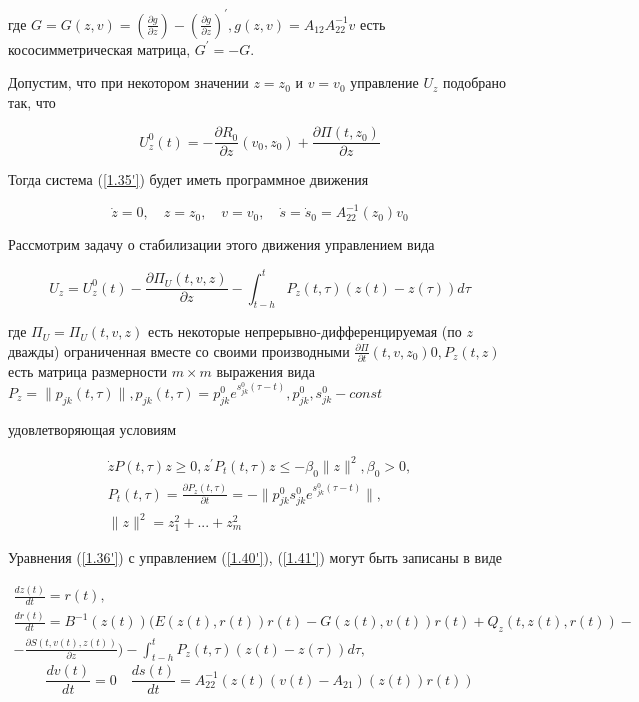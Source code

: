 где $G = G(z, v) = (\frac{\partial g}{\partial z}) - (\frac{\partial g}{\partial z})^{'}, g(z, v) = A_{12} A_{22}^{-1} v$ есть кососимметрическая матрица, $G^{'} = -G$.

Допустим, что при некотором значении $z = z_0$ и $v = v_0$ управление $U_z$ подобрано так, что 

\begin{equation} \label{1.38'}
U_z^0 (t) = - \frac{\partial R_0}{\partial z} (v_0, z_0) + \frac{\partial \Pi (t, z_0)}{\partial z}
\end{equation}

Тогда система (\ref{1.35'}) будет иметь программное движения 

\begin{equation} \label{1.39'}
\dot z = 0, \quad z = z_0, \quad v = v_0, \quad \dot s = \dot s_0 = A_{22}^{-1} (z_0) v_0
\end{equation}

Рассмотрим задачу о стабилизации этого движения управлением вида 

\begin{equation} \label{1.40'}
U_z = U_z^0 (t) - \frac{\partial \Pi_U (t, v, z)}{\partial z} - \int_{t - h}^{t} P_z (t, \tau) (z(t) - z(\tau)) d \tau
\end{equation}

где $\Pi_U = \Pi_U (t, v, z)$ есть некоторые непрерывно-дифференцируемая (по $z$ дважды) ограниченная вместе со своими производными $\frac{\partial \Pi}{\partial t} (t, v, z_0) 0 , P_z(t, z)$ есть матрица размерности $m \times m$ выражения вида $P_z = \| p_{jk} (t, \tau) \|, p_{jk} (t, \tau) = p_{jk}^0 e^{s_{jk}^0 (\tau - t)}, p_{jk}^0, s_{jk}^0 - const$

удовлетворяющая условиям

\begin{equation} \label{1.41'}
\begin{array}{c}
\dot z P(t, \tau) z \ge 0, z^{'} P_t (t, \tau) z \le - \beta_0 \| z \|^2, \beta_0 > 0,\\
P_t (t, \tau) = \frac{\partial P_z (t, \tau)}{\partial t} = - \| p_{jk}^0 s_{jk}^0 e^{s_{jk}^0 (\tau - t)} \|,\\
\| z \| ^ 2 = z_1^2 + ... + z_m^2
\end{array}
\end{equation}

Уравнения (\ref{1.36'}) с управлением (\ref{1.40'}), (\ref{1.41'}) могут быть записаны в виде

\begin{equation} \label{1.42'}
\begin{array}{c}
\displaystyle \frac{d z (t)}{dt} = r(t),\\
\displaystyle \frac{d r(t)}{dt} = B^{-1} (z(t)) (E(z(t), r(t)) r(t) - G(z(t), v(t)) r(t) + Q_z (t, z(t), r(t)) -\\
\displaystyle - \frac{\partial S(t, v(t), z(t))}{\partial z}) - \int_{t - h}^{t} P_z (t, \tau) (z(t) - z(\tau)) d \tau,
\end{array}
\end{equation}
$$\frac{d v(t)}{dt} = 0 \quad \frac{d s(t)}{dt} = A_{22}^{-1} (z(t) (v(t) - A_{21}) (z(t)) r(t))$$

